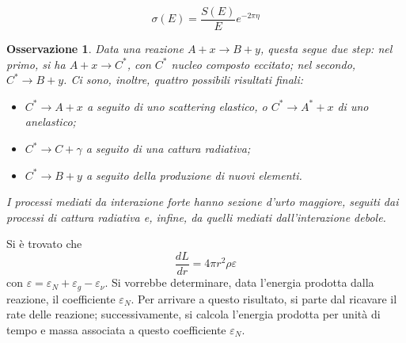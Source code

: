 \documentclass[11pt, a4paper]{scrartcl}
\theoremstyle{style}
\newtheorem{osservazione}{Osservazione}[section]
\theoremstyle{style1}
\numberwithin{equation}{subsection}
\begin{document}
\begin{equation}
	\sigma (E) = \frac{S(E)}{E} e^{-2\pi \eta }
\end{equation}
\begin{osservazione}
Data una reazione $A + x \to  B +y$, questa segue due step: nel primo, si ha $A+x \to C^*$, con $C^*$ nucleo composto eccitato; nel secondo, $C^*\to B+y$.
Ci sono, inoltre, quattro possibili risultati finali:
\begin{itemize}
	\item $C^* \to A+x$ a seguito di uno scattering elastico, o $C^* \to A^* + x$ di uno anelastico; 
	\item $C^* \to C+ \gamma$ a seguito di una cattura radiativa;
	\item $C^* \to B+y$ a seguito della produzione di nuovi elementi.
\end{itemize}
I processi mediati da interazione forte hanno sezione d'urto maggiore, seguiti dai processi di cattura radiativa e, infine, da quelli mediati dall'interazione debole.
\end{osservazione}
\noindent Si \`e trovato che 
\[
\frac{d L}{d r} = 4 \pi r^2 \rho  \varepsilon 
\] 
con $\varepsilon = \varepsilon _N + \varepsilon _g - \varepsilon _\nu $. 
Si vorrebbe determinare, data l'energia prodotta dalla reazione, il coefficiente $\varepsilon _N$.
Per arrivare a questo risultato, si parte dal ricavare il rate delle reazione; successivamente, si calcola l'energia prodotta per unit\`a di tempo e massa associata a questo coefficiente $\varepsilon _N$.
\end{document}
